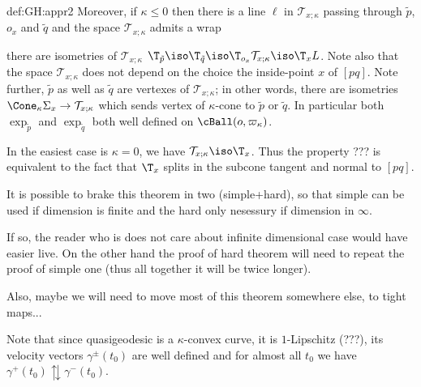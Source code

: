 {\begin{subthm}{def:GH:appr2}
Moreover, if $\kappa\le0$ then there is a line $\ell$ in $\mathcal{T}_{x;\kappa}$ passing through $\tilde p$, $o_x$ and $\tilde q$ and the space $\mathcal{T}_{x;\kappa}$ admits a wrap 

there are isometries of $\mathcal{T}_{x;\kappa}$  $\T_{\tilde p}\iso\T_{\tilde q}\iso\T_{o_x}\mathcal{T}_{x;\kappa}\iso\T_xL$.
Note also that the space $\mathcal{T}_{x;\kappa}$ does not depend on the choice the inside-point $x$ of $[pq]$.
Note further, $\tilde p$ as well as $\tilde q$ are vertexes of $\mathcal{T}_{x;\kappa}$;
in other words, there are isometries $\Cone_\kappa\Sigma_x\to \mathcal{T}_{x;\kappa}$ which sends vertex of $\kappa$-cone to $\tilde p$ or $\tilde q$.
In particular both $\exp_{\tilde p}$ and $\exp_{\tilde q}$ both well defined on $\cBall(o,\varpi_\kappa)$. 

In the easiest case is $\kappa=0$, we have $\mathcal{T}_{x;\kappa}\iso \T_x$.
Thus the property ??? is equivalent to the fact that $\T_x$ splits in the subcone tangent and normal to $[pq]$.
















{\small It is possible to brake this theorem in two (simple+hard), so that simple can be used if dimension is finite and the hard only nesessury if dimension in $\infty$.

If so, the reader who is does not care about infinite dimensional case would have easier live.
On the other hand the proof of hard theorem will need to repeat the proof of simple one (thus all together it will be twice longer).

Also, maybe we will need to move most of this theorem somewhere else, to tight maps...}
















 
Note that since quasigeodesic is a $\kappa$-convex curve, it is $1$-Lipschitz (???),
its velocity vectors $\gamma^\pm(t_0)$ are well defined and for almost all $t_0$ we have $\gamma^+(t_0)\updownarrows\gamma^-(t_0)$.


\end{subthm}}
